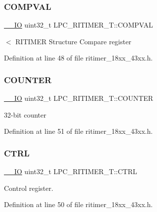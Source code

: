 \subsubsection{\texorpdfstring{C\+O\+M\+P\+V\+AL}{COMPVAL}}
{\footnotesize\ttfamily \hyperlink{core__sc300_8h_aec43007d9998a0a0e01faede4133d6be}{\+\_\+\+\_\+\+IO} uint32\+\_\+t L\+P\+C\+\_\+\+R\+I\+T\+I\+M\+E\+R\+\_\+\+T\+::\+C\+O\+M\+P\+V\+AL}

$<$ R\+I\+T\+I\+M\+ER Structure Compare register 

Definition at line 48 of file ritimer\+\_\+18xx\+\_\+43xx.\+h.

\mbox{\label{struct_l_p_c___r_i_t_i_m_e_r___t_ab7525ee2044799497ef2f87d3f974b8b}} 
\subsubsection{\texorpdfstring{C\+O\+U\+N\+T\+ER}{COUNTER}}
{\footnotesize\ttfamily \hyperlink{core__sc300_8h_aec43007d9998a0a0e01faede4133d6be}{\+\_\+\+\_\+\+IO} uint32\+\_\+t L\+P\+C\+\_\+\+R\+I\+T\+I\+M\+E\+R\+\_\+\+T\+::\+C\+O\+U\+N\+T\+ER}

32-\/bit counter 

Definition at line 51 of file ritimer\+\_\+18xx\+\_\+43xx.\+h.

\mbox{\label{struct_l_p_c___r_i_t_i_m_e_r___t_a059e4d52058cb51138a8ba62445a8cba}} 
\subsubsection{\texorpdfstring{C\+T\+RL}{CTRL}}
{\footnotesize\ttfamily \hyperlink{core__sc300_8h_aec43007d9998a0a0e01faede4133d6be}{\+\_\+\+\_\+\+IO} uint32\+\_\+t L\+P\+C\+\_\+\+R\+I\+T\+I\+M\+E\+R\+\_\+\+T\+::\+C\+T\+RL}

Control register. 

Definition at line 50 of file ritimer\+\_\+18xx\+\_\+43xx.\+h.

